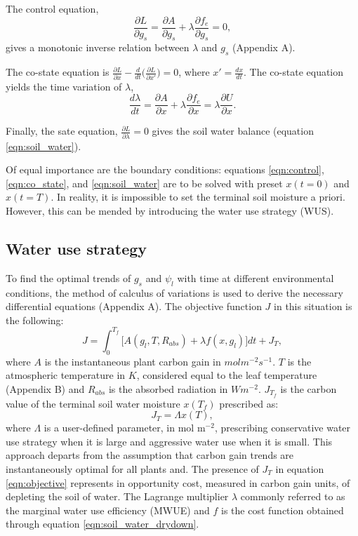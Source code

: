 \documentclass[utf8]{frontiersSCNS} %
\begin{document}
The control equation,
\begin{equation}
    \label{eqn:control}
    \frac{\partial L}{\partial g_s} = \frac{\partial A}{\partial g_s} + \lambda \frac{\partial f_e}{\partial g_s} = 0,
\end{equation}
gives a monotonic inverse relation between $\lambda$ and $g_s$ (Appendix A).

The co-state equation is $\frac{\partial L}{\partial x} - \frac{d}{dt} \Big(\frac{\partial L}{\partial x'} \Big) = 0$, where $x'= \frac{dx}{dt}$. The co-state equation yields the time variation of $\lambda$,
\begin{equation}
    \label{eqn:co_state}
    \frac{d \lambda}{dt} = \frac{\partial A}{\partial x} + \lambda \frac{\partial f_e}{\partial x} = \lambda \frac{\partial U}{\partial x}.
\end{equation}

Finally, the sate equation, $\frac{\partial L}{\partial \lambda} = 0$ gives the soil water balance (equation \ref{eqn:soil_water}). 

Of equal importance are the boundary conditions: equations \ref{eqn:control}, \ref{eqn:co_state}, and \ref{eqn:soil_water} are to be solved with preset $x(t=0)$ and $x(t=T)$. In reality, it is impossible to set the terminal soil moisture a priori. However, this can be mended by introducing the water use strategy (WUS).

\subsection{Water use strategy}

To find the optimal trends of $g_s$ and $\psi_l$ with time at different environmental conditions, the method of calculus of variations is used to derive the necessary differential equations (Appendix A). The objective function $J$ in this situation is the following:
\begin{equation}
    \label{eqn:objective}
    J = \int_0^{T_f}\big[ A(g_l,T,R_{abs}) + \lambda f(x,g_l)\big] dt + J_{T},
\end{equation}
where $A$ is the instantaneous plant carbon gain in $molm^{-2}s^{-1}$. $T$ is the atmospheric temperature in $K$, considered equal to the leaf temperature (Appendix B) and $R_{abs}$ is the absorbed radiation in $Wm^{-2}$. $J_{T_f}$ is the carbon value of the terminal soil water moisture $x(T_f)$ prescribed as:
\begin{equation}
    \label{eqn:terminal_gain}
    J_{T} = \Lambda x(T),
\end{equation}
where $\Lambda$ is a user-defined parameter, in mol m$^{-2}$, prescribing conservative water use strategy when it is large and aggressive water use when it is small. This approach departs from the assumption that carbon gain trends are instantaneously optimal for all plants and. The presence of $J_{T}$ in equation \ref{eqn:objective} represents in opportunity cost, measured in carbon gain units, of depleting the soil of water. The Lagrange multiplier $\lambda$ commonly referred to as the marginal water use efficiency (MWUE) and $f$ is the cost function obtained through equation \ref{eqn:soil_water_drydown}.
\end{document}
